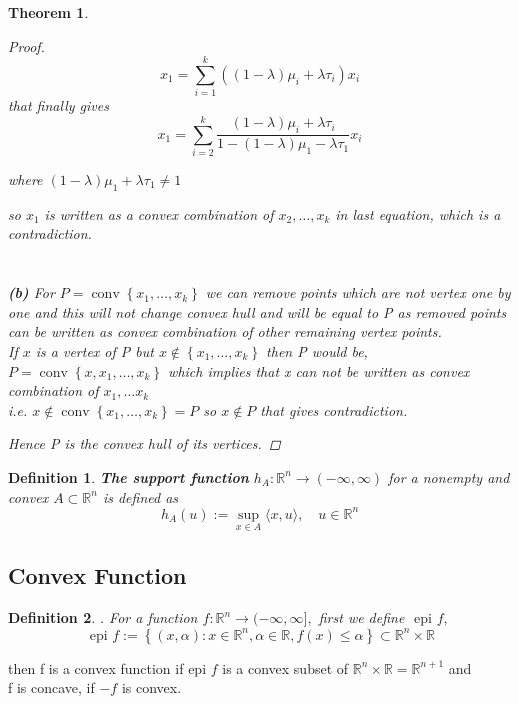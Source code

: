 \documentclass[oneside]{book}
\newtheorem{theorem}{Theorem}[section]
\newtheorem{mydef}{Definition}
\begin{document}
\begin{theorem}
\begin{proof}
\begin{equation} 
\label{eq38}
x_{1}=\sum_{i=1}^{k}\left((1-\lambda) \mu_{i}+\lambda \tau_{i}\right) x_{i}
\end{equation}
that finally gives 
\begin{equation} 
\label{eq39}
x_{1}=\sum_{i=2}^{k} \frac{(1-\lambda) \mu_{i}+\lambda \tau_{i}}{1-(1-\lambda) \mu_{1}-\lambda \tau_{1}} x_{i}
\end{equation}

where $(1-\lambda) \mu_{1}+\lambda \tau_{1} \neq 1$ \par
 so $x_{1}$ is written as a convex combination of $x_{2}, \ldots, x_{k}$ in last equation, which is  a contradiction.
\\\\\\
\textbf{(b)}  For $P=\operatorname{conv}\left\{x_{1}, \ldots, x_{k}\right\}$ we can remove points  which are not vertex  
one by one and this will not change convex hull and will be equal to P as removed points can be written as convex combination of other remaining vertex points. \\
If $x$ is a vertex of P but $x \notin \left\{x_{1}, \ldots, x_{k}\right\} $ then P would be,
$P=\operatorname{conv}\left\{x,x_{1}, \ldots, x_{k}\right\}$ 
which implies that x can not be written as convex combination of $x_{1}, \ldots x_{k}$ \\ i.e. 
 $x \notin  \operatorname{conv} \left\{x_{1}, \ldots, x_{k}\right\} = P  $ so $x \notin P$ that gives contradiction.\par
 Hence P is the convex hull of its vertices.
\end{proof}


\end{theorem}


\begin{mydef}
 \textbf{The support function }$h_{A}: \mathbb{R}^{n} \rightarrow(-\infty, \infty) $  for a nonempty and convex $A \subset \mathbb{R}^{n}$ is defined as
$$
h_{A}(u):=\sup _{x \in A}\langle x, u\rangle, \quad u \in \mathbb{R}^{n}
$$

\end{mydef}



\subsection{Convex Function}



\begin{mydef}. 
For a function   $f: \mathbb{R}^{n} \rightarrow(-\infty, \infty],$ first we define $\text { epi } f, $  
\begin{equation}
\label{eq40}
\text { epi } f:=\left\{(x, \alpha): x \in \mathbb{R}^{n}, \alpha \in \mathbb{R}, f(x) \leq \alpha\right\} \subset \mathbb{R}^{n} \times \mathbb{R} 
\end{equation}
\end{mydef}
  then f is a convex function if epi $f$ is a convex subset of $\mathbb{R}^{n} \times \mathbb{R}=\mathbb{R}^{n+1}$  and \\  f is concave, if $-f$ is convex. 
  
\end{document}
